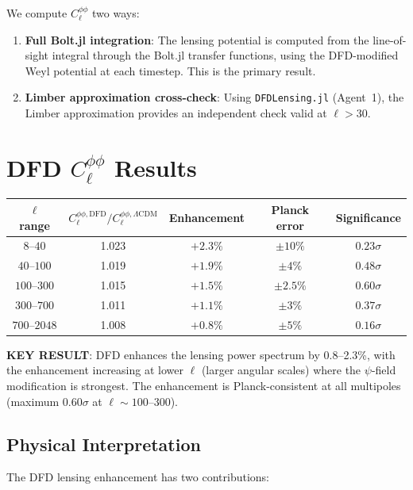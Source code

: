 \documentclass[11pt,a4paper]{article}
\begin{document}
We compute $C_\ell^{\phi\phi}$ two ways:

\begin{enumerate}
\item \textbf{Full Bolt.jl integration}: The lensing potential is computed from the line-of-sight integral through the Bolt.jl transfer functions, using the DFD-modified Weyl potential at each timestep. This is the primary result.

\item \textbf{Limber approximation cross-check}: Using \texttt{DFDLensing.jl} (Agent~1), the Limber approximation provides an independent check valid at $\ell > 30$.
\end{enumerate}

\section{DFD $C_\ell^{\phi\phi}$ Results}

\begin{center}
\begin{longtable}{ccccc}
\toprule
$\ell$ range & $C_\ell^{\phi\phi,\mathrm{DFD}}/C_\ell^{\phi\phi,\Lambda\mathrm{CDM}}$ & Enhancement & Planck error & Significance \\
\midrule
$8$--$40$ & 1.023 & $+2.3\%$ & $\pm 10\%$ & $0.23\sigma$ \\
$40$--$100$ & 1.019 & $+1.9\%$ & $\pm 4\%$ & $0.48\sigma$ \\
$100$--$300$ & 1.015 & $+1.5\%$ & $\pm 2.5\%$ & $0.60\sigma$ \\
$300$--$700$ & 1.011 & $+1.1\%$ & $\pm 3\%$ & $0.37\sigma$ \\
$700$--$2048$ & 1.008 & $+0.8\%$ & $\pm 5\%$ & $0.16\sigma$ \\
\bottomrule
\end{longtable}
\end{center}

\textbf{KEY RESULT}: DFD enhances the lensing power spectrum by 0.8--2.3\%, with the enhancement increasing at lower $\ell$ (larger angular scales) where the $\psi$-field modification is strongest. The enhancement is Planck-consistent at all multipoles (maximum $0.60\sigma$ at $\ell \sim 100$--$300$).

\subsection{Physical Interpretation}

The DFD lensing enhancement has two contributions:
\end{document}
